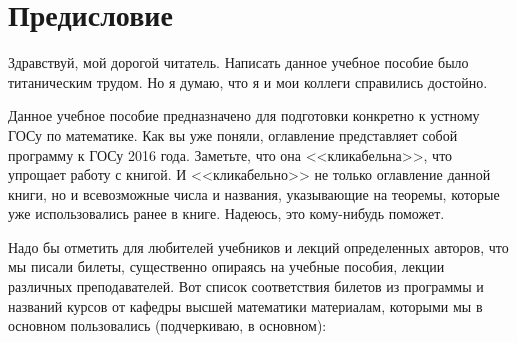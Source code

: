 \chapter{Предисловие}
Здравствуй, мой дорогой читатель. Написать данное учебное пособие было титаническим трудом. Но я думаю, что я и мои коллеги справились достойно.

Данное учебное пособие предназначено для подготовки конкретно к устному ГОСу по математике. Как вы уже поняли, оглавление представляет собой программу к ГОСу 2016 года. Заметьте, что она <<кликабельна>>, что упрощает работу с книгой. И <<кликабельно>> не только оглавление данной книги, но и всевозможные числа и названия, указывающие на теоремы, которые уже использовались ранее в книге. Надеюсь, это кому-нибудь поможет. 

Надо бы отметить для любителей учебников и лекций определенных авторов, что мы писали билеты, существенно опираясь на учебные пособия, лекции различных преподавателей. Вот список соответствия билетов из программы и названий курсов от кафедры высшей математики материалам, которыми мы в основном пользовались (подчеркиваю, в основном):

